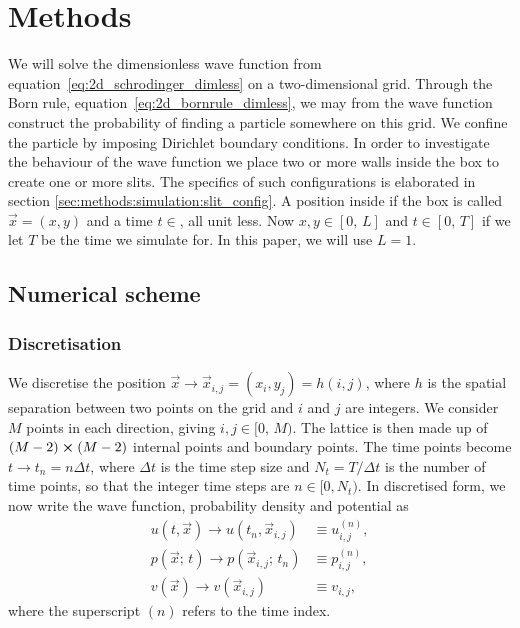 
\section{Methods}\label{sec:methods}

We will solve the dimensionless wave function from equation~\eqref{eq:2d_schrodinger_dimless} on a two-dimensional grid. Through the Born rule, equation~\eqref{eq:2d_bornrule_dimless}, we may from the wave function construct the probability of finding a particle somewhere on this grid. We confine the particle by imposing Dirichlet boundary conditions. In order to investigate the behaviour of the wave function we place two or more walls inside the box to create one or more slits. The specifics of such configurations is elaborated in section \ref{sec:methods:simulation:slit_config}. A position inside if the box is called $\vec{x} =(x, y)$ and a time $t\in$, all unit less. Now $x, y \in [0,\,L]$ and $t\in[0,\,T]$ if we let $T$ be the time we simulate for. In this paper, we will use $L=1$. 

\subsection{Numerical scheme}\label{sec:methods:numerical_scheme}

    \subsubsection{Discretisation}\label{sec:methods:numerical_scheme:discretisation}
        We discretise the position $\vec{x} \to \vec{x}_{i,j} = (x_i, y_j) = h(i,j)$, where $h$ is the spatial separation between two points on the grid and $i$ and $j$ are integers. We consider $M$ points in each direction, giving $i, j \in [0,\, M)$. The lattice is then made up of $(M-2) \cross (M-2)$ internal points and boundary points. The time points become $t\to t_n=n\Delta t$, where $\Delta t$ is the time step size and $N_t = T/\Delta t$ is the number of time points, so that the integer time steps are $n\in[0, N_t)$. In discretised form, we now write the wave function, probability density  and potential as 
        \begin{align}
            u(t, \vec{x}) \to u(t_n, \vec{x}_{i,j}) &\equiv u_{i,j}^{(n)}, \\ 
            p(\vec{x};\, t) \to p(\vec{x}_{i,j};\, t_n) &\equiv p_{i,j}^{(n)}, \\
            v(\vec{x}) \to v(\vec{x}_{i,j})&\equiv v_{i,j}, 
        \end{align}
        where the superscript $(n)$ refers to the time index. 

